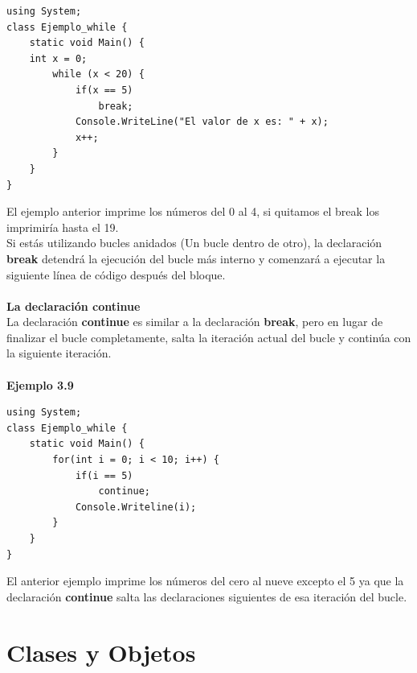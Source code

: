 \documentclass[12pt,a4paper]{report}
\begin{document}
\begin{lstlisting}
using System;
class Ejemplo_while {
	static void Main() {
	int x = 0;
		while (x < 20) {
			if(x == 5)
				break;
			Console.WriteLine("El valor de x es: " + x);
			x++;		
		}
	}
}
\end{lstlisting}El ejemplo anterior imprime los números del 0 al 4, si quitamos el break los imprimiría hasta el 19.\\Si estás utilizando bucles anidados (Un bucle dentro de otro), la declaración \textbf{break} detendrá la ejecución del bucle más interno y comenzará a ejecutar la siguiente línea de código después del bloque.\\\\\textbf{La declaración continue}\\La declaración \textbf{continue} es similar a la declaración \textbf{break}, pero en lugar de finalizar el bucle completamente, salta la iteración actual del bucle y continúa con la siguiente iteración.\\\\\textbf{Ejemplo 3.9}
\begin{lstlisting}
using System;
class Ejemplo_while {
	static void Main() {
		for(int i = 0; i < 10; i++) {
			if(i == 5)
				continue;
			Console.Writeline(i);		
		}	
	}
}
\end{lstlisting}El anterior ejemplo imprime los números del cero al nueve excepto el 5  ya que la declaración \textbf{continue} salta las declaraciones siguientes de esa iteración del bucle.

\chapter{Clases y Objetos}
\end{document}
